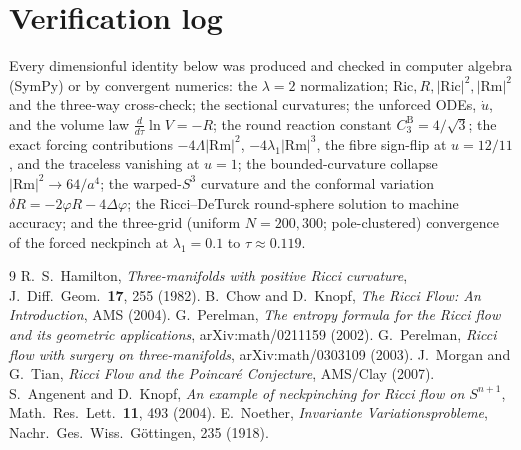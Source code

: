 \documentclass[aps,prd,twocolumn,superscriptaddress,nofootinbib,floatfix]{revtex4-2}
\theoremstyle{plain}
\theoremstyle{definition}
\newcommand{\Rm}{\mathrm{Rm}}
\newcommand{\Ric}{\mathrm{Ric}}
\begin{document}
\section{Verification log}\label{app:verify}
Every dimensionful identity below was produced and checked in computer algebra (SymPy) or by convergent numerics:
the $\lambda=2$ normalization; $\Ric,R,|\Ric|^2,|\Rm|^2$ and the three-way cross-check; the sectional curvatures; the unforced ODEs, $\dot u$, and the volume law $\tfrac{d}{d\tau}\ln V=-R$; the round reaction constant $C_3^{\mathrm B}=4/\sqrt3$; the exact forcing contributions $-4\Lambda|\Rm|^2$, $-4\lambda_1|\Rm|^3$, the fibre sign-flip at $u=12/11$, and the traceless vanishing at $u=1$; the bounded-curvature collapse $|\Rm|^2\to64/a^4$; the warped-$S^3$ curvature and the conformal variation $\delta R=-2\varphi R-4\Delta\varphi$; the Ricci--DeTurck round-sphere solution to machine accuracy; and the three-grid (uniform $N=200,300$; pole-clustered) convergence of the forced neckpinch at $\lambda_1=0.1$ to $\tau\approx0.119$.

\begin{thebibliography}{9}
 R.~S.~Hamilton, \emph{Three-manifolds with positive Ricci curvature}, J.\ Diff.\ Geom.\ \textbf{17}, 255 (1982).
 B.~Chow and D.~Knopf, \emph{The Ricci Flow: An Introduction}, AMS (2004).
 G.~Perelman, \emph{The entropy formula for the Ricci flow and its geometric applications}, arXiv:math/0211159 (2002).
 G.~Perelman, \emph{Ricci flow with surgery on three-manifolds}, arXiv:math/0303109 (2003).
 J.~Morgan and G.~Tian, \emph{Ricci Flow and the Poincar\'e Conjecture}, AMS/Clay (2007).
 S.~Angenent and D.~Knopf, \emph{An example of neckpinching for Ricci flow on $S^{n+1}$}, Math.\ Res.\ Lett.\ \textbf{11}, 493 (2004).
 E.~Noether, \emph{Invariante Variationsprobleme}, Nachr.\ Ges.\ Wiss.\ G\"ottingen, 235 (1918).
\end{thebibliography}
\end{document}
